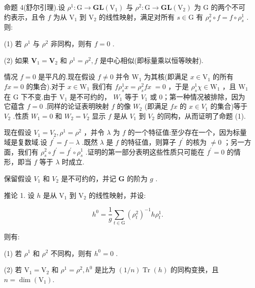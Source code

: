 命题 4(舒尔引理).设 \({\rho }^{1} : \mathrm{G} \rightarrow  \mathbf{{GL}}\left( {\mathrm{V}}_{1}\right)\) 与 \({\rho }^{2} : \mathrm{G} \rightarrow  \mathbf{{GL}}\left( {\mathrm{V}}_{2}\right)\) 为 \(\mathrm{G}\) 的两个不可约表示，且令 \(f\) 为从 \({\mathrm{V}}_{1}\) 到 \({\mathrm{V}}_{2}\) 的线性映射，满足对所有 \(s \in  \mathrm{G}\) 有 \({\rho }_{s}^{2} \circ  f = f \circ  {\rho }_{s}^{1}\) .则:

(1) 若 \({\rho }^{1}\) 与 \({\rho }^{2}\) 非同构，则有 \(f = 0\) .

(2) 如果 \({\mathbf{V}}_{1} = {\mathbf{V}}_{2}\) 和 \({\rho }^{1} = {\rho }^{2},f\) 是中心相似(即标量乘以恒等映射).

情况 \(f = 0\) 是平凡的.现在假设 \(f \neq  0\) 并令 \({\mathrm{W}}_{1}\) 为其核(即满足 \(x \in  {\mathrm{V}}_{1}\) 的所有 \({fx} = 0\) 的集合).对于 \(x \in  {\mathrm{W}}_{1}\) 我们有 \(f{\rho }_{s}^{1}x = {\rho }_{s}^{2}{fx} \; = 0\) ，于是 \({\rho }_{s}^{1}\chi  \in  {\mathrm{W}}_{1}\) ，且 \({\mathrm{W}}_{1}\) 在 G 下不变.由于 \({\mathrm{V}}_{1}\) 是不可约的， \({W}_{1}\) 等于 \({V}_{1}\) 或 0；第一种情况被排除，因为它蕴含 \(f = 0\) .同样的论证表明映射 \(f\) 的像 \({W}_{2}\) (即满足 \({fx}\) 的 \(x \in  {V}_{1}\) 的集合)等于 \({V}_{2}\) .性质 \({W}_{1} = 0\) 和 \({W}_{2} = {V}_{2}\) 显示 \(f\) 是从 \({V}_{1}\) 到 \({V}_{2}\) 的同构，从而证明了命题 (1).

现在假设 \({V}_{1} = {V}_{2},{\rho }^{1} = {\rho }^{2}\) ，并令 \(\lambda\) 为 \(f\) 的一个特征值:至少存在一个，因为标量域是复数域.设 \({f}^{\prime } = f - \lambda\) .既然 \(\lambda\) 是 \(f\) 的特征值，则算子 \({f}^{\prime }\) 的核为 \(\neq  0\) ；另一方面，我们有 \({\rho }_{s}^{2} \circ  {f}^{\prime } = {f}^{\prime } \circ  {\rho }_{s}^{1}\) .证明的第一部分表明这些性质只可能在 \({f}^{\prime } = 0\) 的情形，即当 \(f\) 等于 \(\lambda\) 时成立.

保留假设 \({V}_{1}\) 和 \({V}_{2}\) 是不可约的，并记 \(\mathbf{G}\) 的阶为 \(g\) .

推论 1. 设 \(h\) 是从 \({\mathrm{V}}_{1}\) 到 \({\mathrm{V}}_{2}\) 的线性映射，并设:

\[
{h}^{0} = \frac{1}{g}\mathop{\sum }\limits_{{t \in  \mathrm{G}}}{\left( {\rho }_{t}^{2}\right) }^{-1}h{\rho }_{t}^{1}.
\]

则有:

(1) 若 \({\rho }^{1}\) 和 \({\rho }^{2}\) 不同构，则有 \({h}^{0} = 0\) .

(2) 若 \({\mathrm{V}}_{1} = {\mathrm{V}}_{2}\) 和 \({\rho }^{1} = {\rho }^{2},{h}^{0}\) 是比为 \(\left( {1/n}\right) \operatorname{Tr}\left( h\right)\) 的同构变换，且 \(n = \dim \left( {\mathrm{V}}_{1}\right) .\)

